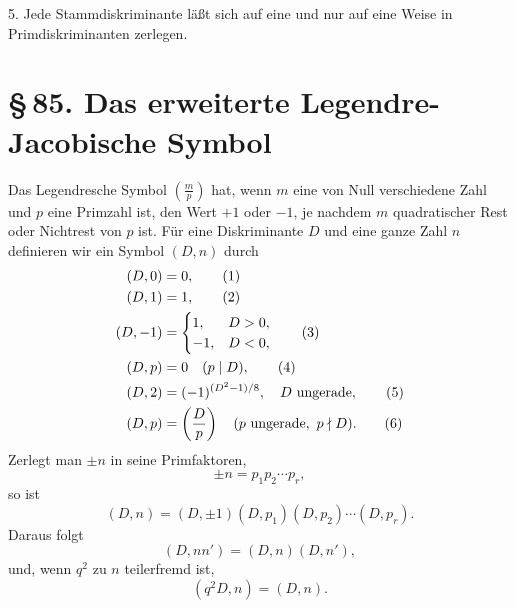 \documentclass[11pt]{article}
\newcommand{\Jac}[2]{\left(\frac{#1}{#2}\right)}
\begin{document}
5. Jede Stammdiskriminante läßt sich auf eine und nur auf eine Weise in Primdiskriminanten zerlegen.

\section*{\S\,85. Das erweiterte Legendre-Jacobische Symbol}

Das Legendresche Symbol \(\Jac{m}{p}\) hat, wenn \(m\) eine von Null verschiedene Zahl und \(p\) eine Primzahl ist, den Wert \(+1\) oder \(-1\), je nachdem \(m\) quadratischer Rest oder Nichtrest von \(p\) ist.  Für eine Diskriminante \(D\) und eine ganze Zahl \(n\) definieren wir ein Symbol \((D,n)\) durch
\begin{align}
        (D,0)&=0,\tag{1}\\
        (D,1)&=1,\tag{2}\\
        (D,-1)&=\begin{cases}1,&D>0,\\ -1,&D<0,\end{cases}\tag{3}\\
        (D,p)&=0\quad(p\mid D),\tag{4}\\
        (D,2)&=(-1)^{(D^2-1)/8},\quad D\hbox{ ungerade},\tag{5}\\
        (D,p)&=\Jac{D}{p}\quad(p\hbox{ ungerade},\ p\nmid D).\tag{6}
\end{align}
Zerlegt man \(\pm n\) in seine Primfaktoren,
\[
        \pm n=p_1p_2\cdots p_r,
\]
so ist
\begin{equation}
        (D,n)=(D,\pm1)(D,p_1)(D,p_2)\cdots(D,p_r).
\tag{7}
\end{equation}
Daraus folgt
\begin{equation}
        (D,nn')=(D,n)(D,n'),
\tag{8}
\end{equation}
und, wenn \(q^2\) zu \(n\) teilerfremd ist,
\begin{equation}
        (q^2D,n)=(D,n).
\tag{9}
\end{equation}
\end{document}
